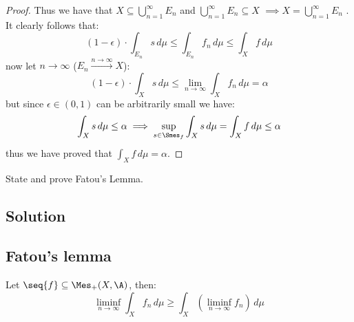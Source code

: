 \begin{proof}
    Thus we have that $X \subseteq \bigcup_{n=1}^\infty E_n$ and $\bigcup_{n=1}^\infty E_n \subseteq X$ $\implies X = \bigcup_{n=1}^\infty E_n$ . \\
    It clearly follows that:
    \[
        (1-\epsilon)\cdot \int_{E_n} s \, d\mu \leq \int_{E_n} f_n \, d\mu \leq \int_X f \, d\mu    
    \]
    now let $n\to\infty$ ($E_n \xrightarrow{n\to\infty} X$):
    \[
        (1-\epsilon)\cdot \int_{X} s \, d\mu \leq  \lim_{n\to\infty} \int_{X} f_n \, d\mu = \alpha 
    \]
    but since $\epsilon \in (0,1)$ can be arbitrarily small we have:
    \[
        \int_X s \, d\mu \leq \alpha \implies \sup_{s\in\Smes_f} \int_X s \, d\mu  = \int_X f \, d\mu \leq \alpha    
    \]
    thus we have proved that $\int_X f \, d\mu = \alpha $.
\end{proof}


\question

State and prove Fatou's Lemma.

\subsection*{Solution}

\subsection{Fatou's lemma}\label{Fatlem}

Let $\seq{f} \subseteq \Mes_+(X,\A)$, then:
\[
    \liminf_{n\to\infty} \int_X f_n \, d\mu \geq \int_X \left( \liminf_{n\to\infty} f_n \right) \, d\mu
\]

